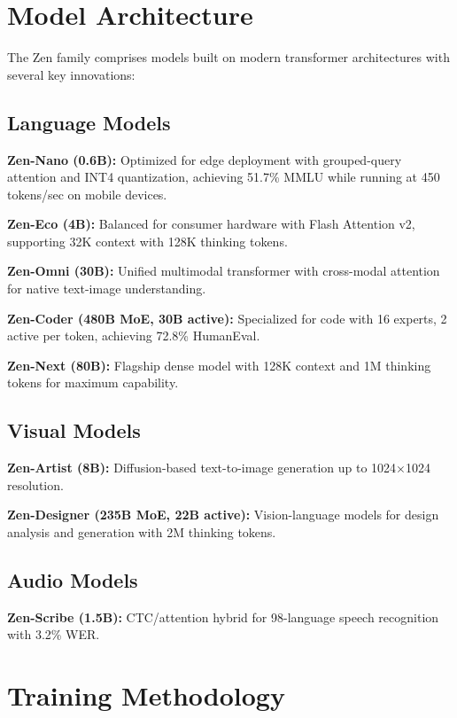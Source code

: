 \documentclass[conference]{IEEEtran}
\begin{document}
\section{Model Architecture}

The Zen family comprises models built on modern transformer architectures with several key innovations:

\subsection{Language Models}

\textbf{Zen-Nano (0.6B):} Optimized for edge deployment with grouped-query attention and INT4 quantization, achieving 51.7\% MMLU while running at 450 tokens/sec on mobile devices.

\textbf{Zen-Eco (4B):} Balanced for consumer hardware with Flash Attention v2, supporting 32K context with 128K thinking tokens.

\textbf{Zen-Omni (30B):} Unified multimodal transformer with cross-modal attention for native text-image understanding.

\textbf{Zen-Coder (480B MoE, 30B active):} Specialized for code with 16 experts, 2 active per token, achieving 72.8\% HumanEval.

\textbf{Zen-Next (80B):} Flagship dense model with 128K context and 1M thinking tokens for maximum capability.

\subsection{Visual Models}

\textbf{Zen-Artist (8B):} Diffusion-based text-to-image generation up to 1024$\times$1024 resolution.

\textbf{Zen-Designer (235B MoE, 22B active):} Vision-language models for design analysis and generation with 2M thinking tokens.

\subsection{Audio Models}

\textbf{Zen-Scribe (1.5B):} CTC/attention hybrid for 98-language speech recognition with 3.2\% WER.

\section{Training Methodology}
\end{document}
